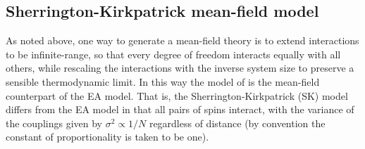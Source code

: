 \subsection{Sherrington-Kirkpatrick mean-field model}
\label{sec:intro-sk}

As noted above, one way to generate a mean-field theory is to extend
interactions to be infinite-range, so that every degree of freedom interacts
equally with all others, while rescaling the interactions with the inverse
system size to preserve a sensible thermodynamic limit. In this way the model
of \textcite{sherrington1975solvable} is the mean-field counterpart of the EA
model. That is, the Sherrington-Kirkpatrick (SK) model differs from the EA
model in that all pairs of spins interact, with the variance of the couplings
given by $\sigma^2 \propto 1/N$ regardless of distance (by convention the
constant of proportionality is taken to be one).

